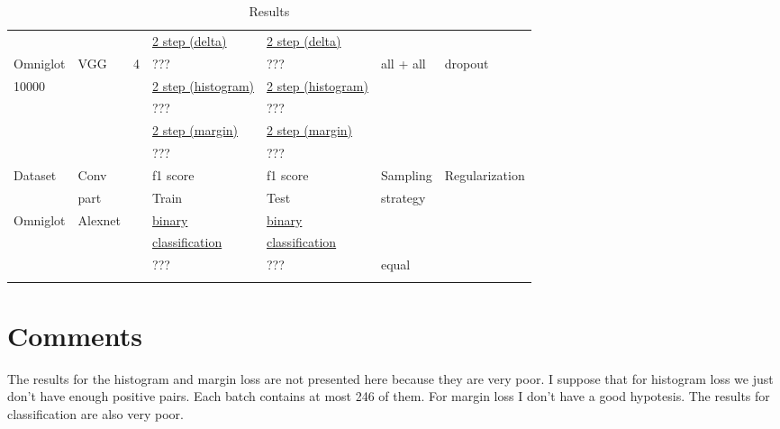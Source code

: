 \documentclass[a4paper,12pt]{extreport}
\begin{document}
\begin{longtable}[h!]{|l|l|l|l|l|l|l|}
            & & & \underline{2 step (delta)}     & \underline{2 step (delta)}     & &                      \\
            Omniglot & VGG & 4 & ??? & ??? & all + all & dropout                        \\ \cline{4-7}
            10000 & & & \underline{2 step (histogram)} & \underline{2 step (histogram)} & &                      \\
            & & & ??? & ??? & &  \\\cline{4-7}
            & & & \underline{2 step (margin)}    & \underline{2 step (margin)}    & &                      \\
            & & & ??? & ??? & &  \\\cline{4-7}
            \hline
            Dataset & Conv & & f1 score & f1 score & Sampling & Regularization       \\
            & part & & Train & Test & strategy &                      \\ \hline
            Omniglot & Alexnet & & \underline{binary} &\underline{binary} & &                      \\
            & & & \underline{classification} & \underline{classification }& &                      \\
            & & & ??? & ??? & equal &                      \\
            \hline
        \caption{Results}
        \label{table:main_table}
    \end{longtable}

    \section{Comments}\label{sec:comments}

    The results for the histogram and margin loss are not presented here because they are very poor.
    I suppose that for histogram loss we just don't have enough positive pairs. Each batch contains at most 246 of them.
    For margin loss I don't have a good hypotesis.
    The results for classification are also very poor.
    \newline
\end{document}
